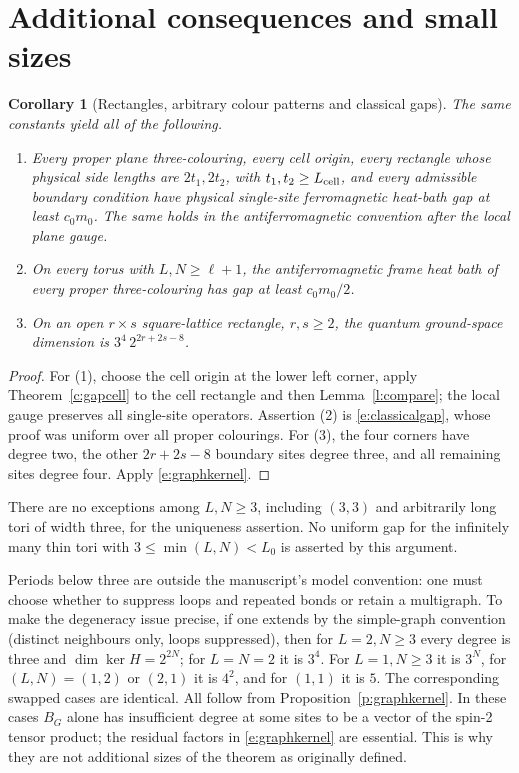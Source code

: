 \documentclass[11pt,reqno]{amsart}
\newtheorem{corollary}[theorem]{Corollary}
\theoremstyle{definition}
\begin{document}
\appendix
\section{Additional consequences and small sizes}
\label{s:consequences}

\begin{corollary}[Rectangles, arbitrary colour patterns and classical gaps]
\label{c:extras}
The same constants yield all of the following.
\begin{enumerate}
\item Every proper plane three-colouring, every cell origin, every
rectangle whose physical side lengths are $2t_1,2t_2$, with
$t_1,t_2\ge L_{\rm cell}$, and every admissible boundary condition
have physical single-site ferromagnetic heat-bath gap at least
$c_0m_0$. The same holds in the antiferromagnetic convention after
the local plane gauge.
\item On every torus with $L,N\ge\ell+1$, the antiferromagnetic
frame heat bath of every proper three-colouring has gap at least
$c_0m_0/2$.
\item On an open $r\times s$ square-lattice rectangle, $r,s\ge2$,
the quantum ground-space dimension is
$3^4\,2^{2r+2s-8}$.
\end{enumerate}
\end{corollary}
\begin{proof}
For (1), choose the cell origin at the lower left corner, apply
Theorem~\ref{c:gapcell} to the cell rectangle and then
Lemma~\ref{l:compare}; the local gauge preserves all single-site
operators. Assertion (2) is \eqref{e:classicalgap}, whose proof was
uniform over all proper colourings. For (3), the four corners have
degree two, the other $2r+2s-8$ boundary sites degree three, and
all remaining sites degree four. Apply \eqref{e:graphkernel}.
\end{proof}

There are no exceptions among $L,N\ge3$, including $(3,3)$ and
arbitrarily long tori of width three, for the uniqueness assertion.
No uniform gap for the infinitely many thin tori with
$3\le\min(L,N)<L_0$ is asserted by this argument.

Periods below three are outside the manuscript's model convention:
one must choose whether to suppress loops and repeated bonds or
retain a multigraph. To make the degeneracy issue precise, if one
extends by the simple-graph convention (distinct neighbours only,
loops suppressed), then for $L=2,N\ge3$ every degree is three and
$\dim\ker H=2^{2N}$; for $L=N=2$ it is $3^4$.
For $L=1,N\ge3$ it is $3^N$, for $(L,N)=(1,2)$ or $(2,1)$ it is
$4^2$, and for $(1,1)$ it is $5$. The corresponding swapped cases
are identical. All follow from Proposition~\ref{p:graphkernel}.
In these cases $B_G$ alone has insufficient degree at some sites
to be a vector of the spin-2 tensor product; the residual factors
in \eqref{e:graphkernel} are essential. This is why they are not
additional sizes of the theorem as originally defined.
\end{document}

